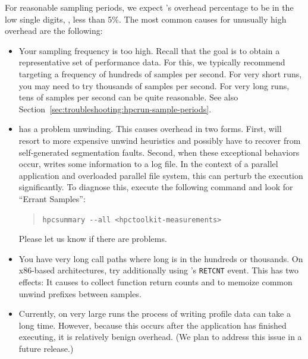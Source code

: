 \documentclass[11pt,letterpaper]{report}
\begin{document}
For reasonable sampling periods, we expect \hpcrun{}'s overhead percentage to be in the low single digits, \eg{}, less than 5\%.
The most common causes for unusually high overhead are the following:
\begin{itemize}

\item Your sampling frequency is too high.
  Recall that the goal is to obtain a representative set of performance data.
  For this, we typically recommend targeting a frequency of hundreds of samples per second.
  For very short runs, you may need to try thousands of samples per second.
  For very long runs, tens of samples per second can be quite reasonable.
  See also Section~\ref{sec:troubleshooting:hpcrun-sample-periods}.

\item \hpcrun{} has a problem unwinding.
  This causes overhead in two forms.
  First, \hpcrun{} will resort to more expensive unwind heuristics and possibly have to recover from self-generated segmentation faults.
  Second, when these exceptional behaviors occur, \hpcrun{} writes some information to a log file.
  In the context of a parallel application and overloaded parallel file system, this can perturb the execution significantly.
  To diagnose this, execute the following command and look for ``Errant Samples'':
  \begin{quote}
  \verb|hpcsummary --all <hpctoolkit-measurements>|
  \end{quote}
  Please let us know if there are problems.

\item You have very long call paths where long is in the hundreds or thousands.
  On x86-based architectures, try additionally using \hpcrun{}'s \texttt{RETCNT} event.
  This has two effects: It causes \hpcrun{} to collect function return counts and to memoize common unwind prefixes between samples.

\item Currently, on very large runs the process of writing profile data can take a long time.
  However, because this occurs after the application has finished executing, it is relatively benign overhead.
  (We plan to address this issue in a future release.)

\end{itemize}


\end{document}
